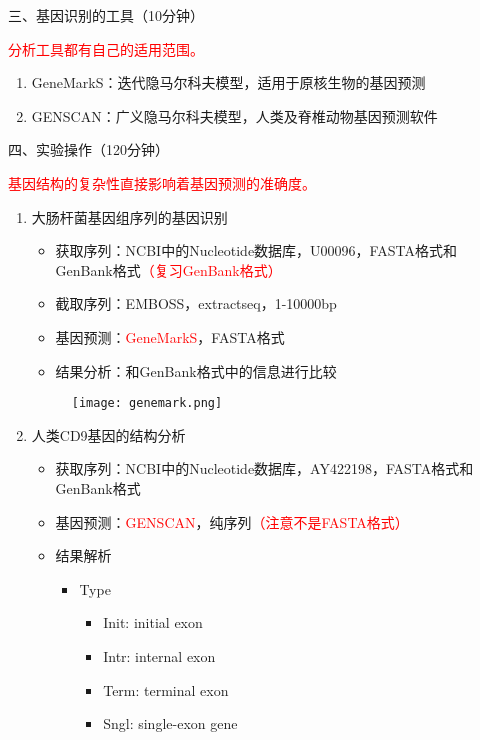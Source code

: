 \documentclass{TIJMUjiaoanSY}
\begin{document}
\vspace*{0.2cm}
\noindent
三、基因识别的工具（10分钟）

\textcolor{red}{分析工具都有自己的适用范围。}
\begin{enumerate}
  \item GeneMarkS：迭代隐马尔科夫模型，适用于原核生物的基因预测
  \item GENSCAN：广义隐马尔科夫模型，人类及脊椎动物基因预测软件
\end{enumerate}


\otherTail
\newpage
\otherHeader


\noindent
四、实验操作（120分钟）

\textcolor{red}{基因结构的复杂性直接影响着基因预测的准确度。}
\begin{enumerate}
  \item 大肠杆菌基因组序列的基因识别
    \begin{itemize}
      \item 获取序列：NCBI中的Nucleotide数据库，U00096，FASTA格式和GenBank格式\textcolor{red}{（复习GenBank格式）}
      \item 截取序列：EMBOSS，extractseq，1-10000bp
      \item 基因预测：\textcolor{red}{GeneMarkS}，FASTA格式
      \item 结果分析：和GenBank格式中的信息进行比较
    \end{itemize}
\begin{figure}[h]
  \centering
  \texttt{[image: genemark.png]}
\end{figure}
  \item 人类CD9基因的结构分析
    \begin{itemize}
      \item 获取序列：NCBI中的Nucleotide数据库，AY422198，FASTA格式和GenBank格式
      \item 基因预测：\textcolor{red}{GENSCAN}，纯序列\textcolor{red}{（注意不是FASTA格式）}
      \item 结果解析
        \begin{itemize}
          \item Type
            \begin{itemize}
              \item Init: initial exon
              \item Intr: internal exon
              \item Term: terminal exon
              \item Sngl: single-exon gene

\end{itemize}
\end{itemize}
\end{itemize}
\end{enumerate}
\end{document}
